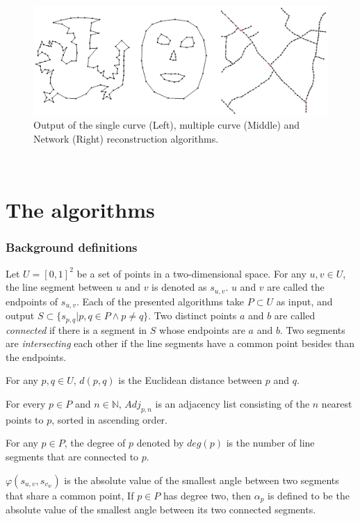 \documentclass[11pt]{article}
\begin{document}
\begin{figure}[ht!]
\centering
\includegraphics[scale=0.3]{images/outputOverview.png}
\caption{Output of the single curve (Left), multiple curve (Middle) and Network (Right) reconstruction algorithms.}
\label{outputOverview}
\end{figure}$ $\\


\section{The algorithms}
\label{se:algorithms}
\subsubsection{Background definitions}
Let $U = [0,1]^2$ be a set of points in a two-dimensional space.
For any $u,v \in U$, the line segment between $u$ and $v$ is denoted as $s_{u,v}$. $u$ and $v$ are called the endpoints of $s_{u,v}$. Each of the presented algorithms take $P \subset U$ as input, and output $S \subset \{s_{p,q} | p,q \in P \land p \neq q \}$.
 Two distinct points $a$ and $b$ are called \textit{connected} if there is a segment in $S$ whose endpoints are $a$ and $b$.
 Two segments are \textit{intersecting} each other if the line segments have a common point besides than the endpoints.

For any $p,q \in U$, $d(p,q)$ is the Euclidean distance between $p$ and $q$. %

For every $p \in P$ and $n \in \mathbb{N}$, $Adj_{p,n}$ is an adjacency list consisting of the $n$ nearest points to $p$, sorted in ascending order.

For any $p \in P$, the degree of $p$ denoted by $deg(p)$ is the number of line segments that are connected to $p$.

$\varphi(s_{u,v}, s_{v_w})$ is the absolute value of the smallest angle between two segments that share a common point,
If $p \in P$ has degree two, then $\alpha_p$ is defined to be the absolute value of the smallest angle between its two connected segments. %
\end{document}
